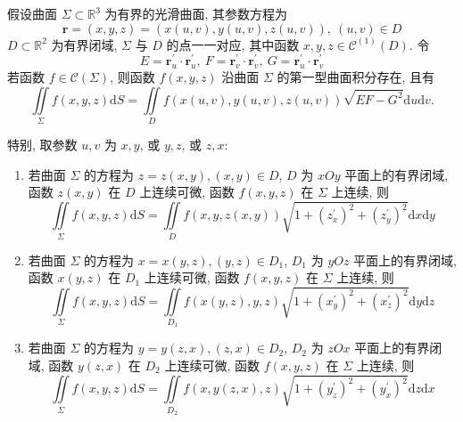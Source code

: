\begin{theorem}[第一型曲面积分化为二重积分]
    假设曲面 $ \varSigma \subset \mathbb{R}^{3} $ 为有界的光滑曲面, 其参数方程为
    $$\boldsymbol{r}=(x, y, z)=(x(u, v), y(u, v), z(u, v)), ~ (u, v) \in D$$
    $D \subset \mathbb{R}^{2} $ 为有界闭域, $\varSigma $ 与 $ D $ 的点一一对应, 其中函数 $ x, y, z \in \mathscr{C}^{(1)}(D) $. 令
    $$E=\boldsymbol{r}_{u}^{\prime} \cdot \boldsymbol{r}_{u}^{\prime}, ~  F=\boldsymbol{r}_{v}^{\prime} \cdot \boldsymbol{r}_{v}^{\prime}, ~  G=\boldsymbol{r}_{u}^{\prime} \cdot \boldsymbol{r}_{v}^{\prime}$$
    若函数 $ f \in \mathscr{C}(\varSigma) $, 则函数 $ f(x, y, z) $ 沿曲面 $ \varSigma $ 的第一型曲面积分存在, 且有
    $$\iint\limits_{\varSigma} f(x, y, z) \mathrm{d} S=\iint\limits_{D} f(x(u, v), y(u, v), z(u, v)) \sqrt{EF-G^{2}} \mathrm{d} u \mathrm{d} v.$$

    特别, 取参数 $ u, v $ 为 $ x, y $, 或 $ y, z $, 或 $ z, x $:
    \begin{enumerate}[label=(\arabic{*})]
        \item 若曲面 $ \varSigma $ 的方程为 $ z=z(x, y),(x, y) \in D$, $D $ 为 $ x O y $ 平面上的有界闭域, 函数 $ z(x, y) $ 在 $ D $ 上连续可微, 函数 $ f(x, y, z) $ 在 $ \varSigma $ 上连续, 则
              $$\iint\limits_{\varSigma} f(x, y, z) \mathrm{d} S=\iint\limits_{D} f(x, y, z(x, y)) \sqrt{1+\left(z_{x}^{\prime}\right)^{2}+\left(z_{y}^{\prime}\right)^{2}} \mathrm{d} x \mathrm{d} y$$
        \item 若曲面 $ \varSigma $ 的方程为 $ x=x(y, z),(y, z) \in D_{1}$, $D_{1} $ 为 $ y O z $ 平面上的有界闭域, 函数 $ x(y, z) $ 在 $ D_{1} $ 上连续可微, 函数 $ f(x, y, z) $ 在 $ \varSigma $ 上连续, 则
              $$\iint\limits_{\varSigma} f(x, y, z) \mathrm{d} S=\iint\limits_{D_{1}} f(x(y, z), y, z) \sqrt{1+\left(x_{y}^{\prime}\right)^{2}+\left(x_{z}^{\prime}\right)^{2}} \mathrm{d} y \mathrm{d} z$$
        \item 若曲面 $ \varSigma $ 的方程为 $ y=y(z, x),(z, x) \in D_{2}$, $D_{2} $ 为 $ z O x $ 平面上的有界闭域, 函数 $ y(z, x) $ 在 $ D_{2} $ 上连续可微, 函数 $ f(x, y, z) $ 在 $ \varSigma $ 上连续, 则
              $$\iint\limits_{\varSigma} f(x, y, z) \mathrm{d} S=\iint\limits_{D_{2}} f(x, y(z, x), z) \sqrt{1+\left(y_{z}^{\prime}\right)^{2}+\left(y_{x}^{\prime}\right)^{2}} \mathrm{d} z \mathrm{d} x$$
    \end{enumerate}
\end{theorem}

